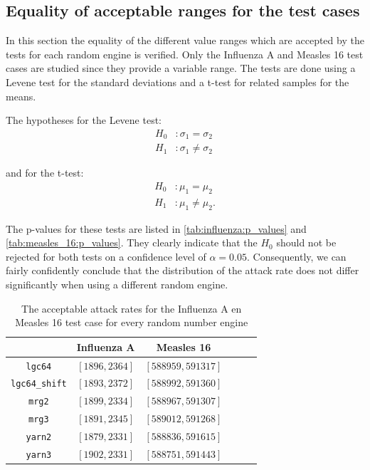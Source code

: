\documentclass{acmart}
\begin{document}
\subsection{Equality of acceptable ranges for the test cases}

In this section the equality of the different value ranges which are accepted by the tests for each random engine is verified. Only the Influenza A and Measles 16 test cases are studied since they provide a variable range. The tests are done using a Levene test for the standard deviations and a t-test for related samples for the means.

The hypotheses for the Levene test:
\[
\begin{aligned}
 H_0 &: \sigma_1 = \sigma_2\\
 H_1 &: \sigma_1 \ne \sigma_2\
\end{aligned}
\]

and for the t-test:
\[
\begin{aligned}
 H_0 &: \mu_1 = \mu_2  \\
 H_1 &: \mu_1 \ne \mu_2.
\end{aligned}
\]

The p-values for these tests are listed in \cref{tab:influenza:p_values} and \cref{tab:measles_16:p_values}. They clearly indicate that the \(H_0\) should not be rejected for both tests on a confidence level of $\alpha = 0.05$. Consequently, we can fairly confidently conclude that the distribution of the attack rate does not differ significantly when using a different random engine.


\begin{table}[!hbt]
    \centering
    \bgroup
    \def\arraystretch{2}
    \begin{tabular}{c|c|c|c|c|c}
                                & \textbf{Influenza A}  & \textbf{Measles 16} \\ \hline
        \texttt{lgc64}          & \([1896, 2364]\)       & \([588959, 591317]\) \\
        \texttt{lgc64\_shift}   & \([1893, 2372]\)       & \([588992, 591360]\) \\
        \texttt{mrg2}           & \([1899, 2334]\)       & \([588967, 591307]\) \\
        \texttt{mrg3}           & \([1891, 2345]\)       & \([589012, 591268]\) \\
        \texttt{yarn2}          & \([1879, 2331]\)       & \([588836, 591615]\) \\
        \texttt{yarn3}          & \([1902, 2331]\)       & \([588751, 591443]\) \\
    \end{tabular}
    \egroup
    \caption{The acceptable attack rates for the Influenza A en Measles 16 test case for every random number engine}
    \label{tab:ranges_engines}
\end{table}
\end{document}
